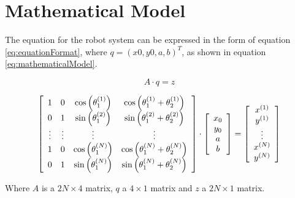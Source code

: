 \section{Mathematical Model}

The equation for the robot system can be expressed in the form of equation \ref{eq:equationFormat}, where $q = (x0, y0, a, b)^T$, as shown in equation \ref{eq:mathematicalModel}.

\begin{equation}
A \cdot q = z
\label{eq:equationFormat}
\end{equation}

\begin{equation}
\left[
\begin{array}{c c c c}
1 & 0 & \cos\left( \theta_1^{(1)}\right)  & \cos\left(\theta_1^{(1)} + \theta_2^{(1)} \right) \\
0 & 1 & \sin\left(\theta_1^{(2)}\right)  & \sin\left(\theta_1^{(2)} + \theta_2^{(2)}\right)  \\
\vdots & \vdots & \vdots & \vdots \\
1 & 0 & \cos\left(\theta_1^{(N)}\right)  & \cos\left(\theta_1^{(N)} + \theta_2^{(N)}\right)  \\
0 & 1 & \sin\left(\theta_1^{(N)}\right)  & \sin\left(\theta_1^{(N)} + \theta_2^{(N)}\right)  \\
\end{array}
\right]
\cdot
\left[
\begin{array}{c}
x_0 \\
y_0 \\
a \\
b \\
\end{array}
\right]
=
\left[
\begin{array}{c}
x^{(1)} \\
y^{(1)} \\
\vdots \\
x^{(N)} \\
y^{(N)} \\
\end{array}
\right]
\label{eq:mathematicalModel}
\end{equation}

Where $A$ is a $2 N \times 4$ matrix, $q$ a $4 \times 1$ matrix and $z$ a $2 N \times 1$ matrix.